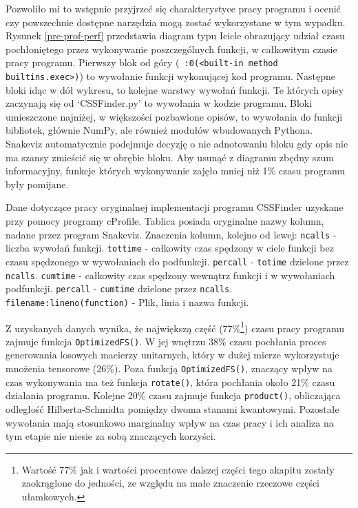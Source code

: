 \documentclass[11pt, a4paper]{article}
\newcommand{\code}[1]{\texttt{#1}}
\begin{document}
\begin{sloppypar}
    Pozwoliło mi to wstępnie przyjrzeć się charakterystyce pracy programu i ocenić czy
    powszechnie dostępne narzędzia mogą zostać wykorzystane w tym wypadku. Rysunek \ref{pre-prof-perf}
    przedstawia diagram typu Icicle obrazujący udział czasu pochłoniętego przez wykonywanie
    poszczególnych funkcji, w całkowitym czasie pracy programu. Pierwszy blok od góry (\code{~:0(<built-in method builtins.exec>)})
    to wywołanie funkcji wykonującej kod programu. Następne bloki idąc w dół wykresu, to
    kolejne warstwy wywołań funkcji. Te których opisy zaczynają się od `CSSFinder.py' to
    wywołania w kodzie programu. Bloki umieszczone najniżej, w większości pozbawione opisów,
    to wywołania do funkcji bibliotek, głównie NumPy, ale również modułów wbudowanych
    Pythona. Snakeviz automatycznie podejmuje decyzję o nie adnotowaniu bloku gdy opis nie
    ma szansy zmieścić się w obrębie bloku. Aby usunąć z diagramu zbędny szum
    informacyjny, funkcje których wykonywanie zajęło mniej niż 1\% czasu programu były
    pomijane.

    \begin{table}[ht]
      \tiny
      \centering
      
      \caption{Dane dotyczące pracy oryginalnej implementacji programu CSSFinder uzyskane przy pomocy programy cProfile. Tablica posiada oryginalne nazwy kolumn, nadane przez program Snakeviz. Znaczenia kolumn, kolejno od lewej: \code{ncalls} - liczba wywołań funkcji. \code{tottime} - całkowity czas spędzony w ciele funkcji bez czasu spędzonego w wywołaniach do podfunkcji. \code{percall} - \code{totime} dzielone przez \code{ncalls}. \code{cumtime} - całkowity czas spędzony wewnątrz funkcji i w wywołaniach podfunkcji. \code{percall} - \code{cumtime} dzielone przez \code{ncalls}. \code{filename:lineno(function)} - Plik, linia i nazwa funkcji.}
    \end{table}

    Z uzyskanych danych wynika, że największą część (77\%\footnote{Wartość 77\% jak i
    wartości procentowe dalszej części tego akapitu zostały zaokrąglone do jedności, ze względu
    na małe znaczenie rzeczowe części ułamkowych.}) czasu pracy programu zajmuje funkcja
    \code{OptimizedFS()}. W jej wnętrzu 38\% czasu pochłania proces generowania losowych
    macierzy unitarnych, który w dużej mierze wykorzystuje mnożenia tensorowe (26\%).
    Poza funkcją \code{OptimizedFS()}, znaczący wpływ na czas wykonywania ma też funkcja
    \code{rotate()}, która pochłania około 21\% czasu działania programu. Kolejne 20\% czasu
    zajmuje funkcja \code{product()}, obliczająca odległość Hilberta-Schmidta pomiędzy dwoma
    stanami kwantowymi. Pozostałe wywołania mają stosunkowo marginalny wpływ na czas
    pracy i ich analiza na tym etapie nie niesie za sobą znaczących korzyści.


\end{sloppypar}
\end{document}
